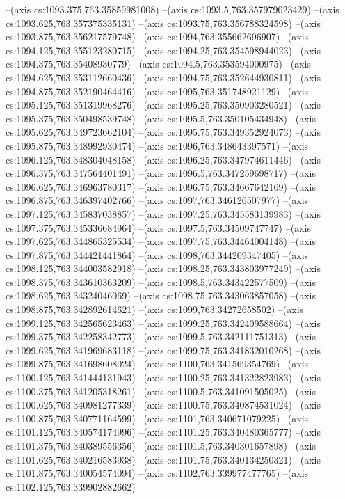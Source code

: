 --(axis cs:1093.375,763.35859981008)
--(axis cs:1093.5,763.357979023429)
--(axis cs:1093.625,763.357375335131)
--(axis cs:1093.75,763.356788324598)
--(axis cs:1093.875,763.356217579748)
--(axis cs:1094,763.355662696907)
--(axis cs:1094.125,763.355123280715)
--(axis cs:1094.25,763.354598944023)
--(axis cs:1094.375,763.35408930779)
--(axis cs:1094.5,763.353594000975)
--(axis cs:1094.625,763.353112660436)
--(axis cs:1094.75,763.352644930811)
--(axis cs:1094.875,763.352190464416)
--(axis cs:1095,763.351748921129)
--(axis cs:1095.125,763.351319968276)
--(axis cs:1095.25,763.350903280521)
--(axis cs:1095.375,763.350498539748)
--(axis cs:1095.5,763.350105434948)
--(axis cs:1095.625,763.349723662104)
--(axis cs:1095.75,763.349352924073)
--(axis cs:1095.875,763.348992930474)
--(axis cs:1096,763.348643397571)
--(axis cs:1096.125,763.348304048158)
--(axis cs:1096.25,763.347974611446)
--(axis cs:1096.375,763.347564401491)
--(axis cs:1096.5,763.347259698717)
--(axis cs:1096.625,763.346963780317)
--(axis cs:1096.75,763.34667642169)
--(axis cs:1096.875,763.346397402766)
--(axis cs:1097,763.346126507977)
--(axis cs:1097.125,763.345837038857)
--(axis cs:1097.25,763.345583139983)
--(axis cs:1097.375,763.345336684964)
--(axis cs:1097.5,763.34509747747)
--(axis cs:1097.625,763.344865325534)
--(axis cs:1097.75,763.34464004148)
--(axis cs:1097.875,763.344421441864)
--(axis cs:1098,763.344209347405)
--(axis cs:1098.125,763.344003582918)
--(axis cs:1098.25,763.343803977249)
--(axis cs:1098.375,763.343610363209)
--(axis cs:1098.5,763.343422577509)
--(axis cs:1098.625,763.34324046069)
--(axis cs:1098.75,763.343063857058)
--(axis cs:1098.875,763.342892614621)
--(axis cs:1099,763.34272658502)
--(axis cs:1099.125,763.342565623463)
--(axis cs:1099.25,763.342409588664)
--(axis cs:1099.375,763.342258342773)
--(axis cs:1099.5,763.342111751313)
--(axis cs:1099.625,763.341969683118)
--(axis cs:1099.75,763.341832010268)
--(axis cs:1099.875,763.341698608024)
--(axis cs:1100,763.341569354769)
--(axis cs:1100.125,763.341444131943)
--(axis cs:1100.25,763.341322823983)
--(axis cs:1100.375,763.341205318261)
--(axis cs:1100.5,763.341091505025)
--(axis cs:1100.625,763.340981277339)
--(axis cs:1100.75,763.340874531024)
--(axis cs:1100.875,763.340771164599)
--(axis cs:1101,763.340671079225)
--(axis cs:1101.125,763.340574174996)
--(axis cs:1101.25,763.340480365777)
--(axis cs:1101.375,763.340389556356)
--(axis cs:1101.5,763.340301657898)
--(axis cs:1101.625,763.340216583938)
--(axis cs:1101.75,763.340134250321)
--(axis cs:1101.875,763.340054574094)
--(axis cs:1102,763.339977477765)
--(axis cs:1102.125,763.339902882662)
